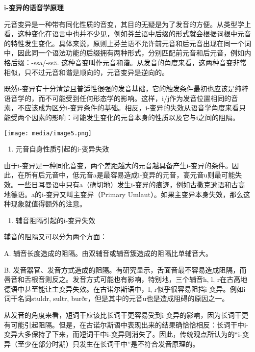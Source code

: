 {{\textbf{i-变异的语音学原理}

元音变异是一种带有同化性质的音变，其目的无疑是为了发音的方便。从类型学上看，这种变化在语言中也并不少见，例如芬兰语中后缀的形式就会根据词根中元音的特性发生变化。具体来说，原则上芬兰语不允许前元音和后元音出现在同一个词中，因此同一个语法功能的后缀拥有两种形式，分别匹配前元音和后元音，例如内格后缀：-ssa/-ssä.
这种音变叫作元音和谐。从发音的角度来看，这两种音变非常相似，只不过元音和谐是顺向的，元音变异是逆向的。

既然i-变异有十分清楚且普适性很强的发音基础，它的触发条件最初也应该是纯粹语音学的，而不可能受到任何形态学的影响。这样，i/j作为发音位置相同的音素，不应该成为区分i-变异条件的基础。相反，i-变异的失效从语音学角度来看只能受两个因素的影响：可能发生变化的元音本身的性质以及它与i之间的阻隔。

\texttt{[image: media/image5.png]}

\begin{enumerate}
  \def\labelenumi{\arabic{enumi})}
  \item
        元音自身性质引起的i-变异失效
\end{enumerate}

由于i-变异是一种同化音变，两个差距越大的元音越具备产生i-变异的条件。因此，在所有后元音中，低元音a是最容易造成i-变异的元音，高元音u则最可能失效。一些日耳曼语中只有a（确切地）发生i-变异的痕迹，例如古撒克逊语和古高地德语。a的i-变异又叫主变异（Primary
Umlaut）。如果主变异本身失效，那么这种现象就值得额外的注意。

\begin{enumerate}
  \def\labelenumi{\arabic{enumi})}
  \setcounter{enumi}{1}
  \item
        辅音阻隔引起的i-变异失效
\end{enumerate}

辅音的阻隔又可以分为两个方面：

A. 辅音长度造成的阻隔。由双辅音或辅音簇造成的阻隔比单辅音大。

B.
发音器官、发音方式造成的阻隔。有研究显示，舌面音最不容易造成阻隔，而唇音和舌根音则反之。发音方式可能也有影响，特别地，三个辅音h,
l, r在古高地德语中甚至能让主变异失效。在古诺尔斯语中，l,
r似乎很容易阻挡i-变异。例如i-词干名词stuldr, sultr,
burðr，但是其中的元音u也是造成阻碍的原因之一。

从发音的角度来看，短词干应该比长词干更容易受到i-变异的影响，因为长词干更有可能引起阻隔。但是，在古诺尔斯语中表现出来的结果确恰恰相反：长词干中i-变异大多保持了下来，而短词干中i-变异则消失了。因此，传统观点所认为的``i-变异（至少在部分时期）只发生在长词干中''是不符合发音原理的。

}}
